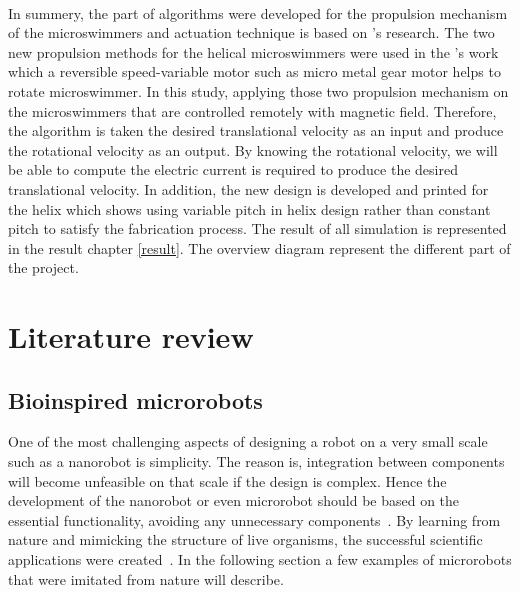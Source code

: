\documentclass[12pt,a4paper,titlepage]{report}
\begin{document}
\paragraph{}
In summery, the part of algorithms were developed for the propulsion mechanism of the microswimmers
and actuation technique is based on \citeauthor{mahoney2011velocity}\rq{}s research. The two new 
propulsion methods for the helical microswimmers were used in the \citeauthor{rodenborn2013propulsion}\rq{}s
work which a reversible speed-variable motor such as micro metal gear motor helps to rotate 
microswimmer. In this study, applying those two propulsion mechanism on the microswimmers that 
are controlled remotely with magnetic field. Therefore, the algorithm is taken the desired translational
velocity as an input and produce the rotational velocity as an output. By knowing the rotational velocity, 
we will be able to compute the electric current is required to produce the desired translational velocity. 
In addition, the new design is developed and printed for the helix which shows using variable pitch
 in helix design rather than constant pitch to satisfy the fabrication process. The result of all simulation is
represented in the result chapter \ref{result}. The overview diagram represent the different part of the project.












\section{Literature review}
 


\subsection{Bioinspired microrobots}

One of the most challenging aspects of designing a robot on a very small scale such 
as a nanorobot is simplicity. The reason is, integration between components
will become unfeasible on that
 scale if the design is complex. Hence the development of the nanorobot or even microrobot
 should be based on the essential functionality, avoiding any unnecessary components~\citep{gao2013bioinspired}.
By learning from nature and mimicking the structure of live organisms, the successful  
scientific applications were created~\citep{qiunanohelices}. In the following section a
 few examples of microrobots that were imitated from nature will describe. 
 
\end{document}
